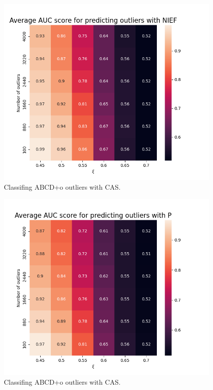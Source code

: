 \documentclass{beamer}
\begin{document}
\begin{frame}{}
    \begin{figure}
        \includegraphics[height=0.9\textheight]{figures/outlier-auc-nief.png}
        \caption{Classifing ABCD+o outliers with CAS.}
    \end{figure}
\end{frame}
\begin{frame}{}
    \begin{figure}
        \includegraphics[height=0.9\textheight]{figures/outlier-auc-p.png}
        \caption{Classifing ABCD+o outliers with CAS.}
    \end{figure}
\end{frame}
\end{document}
